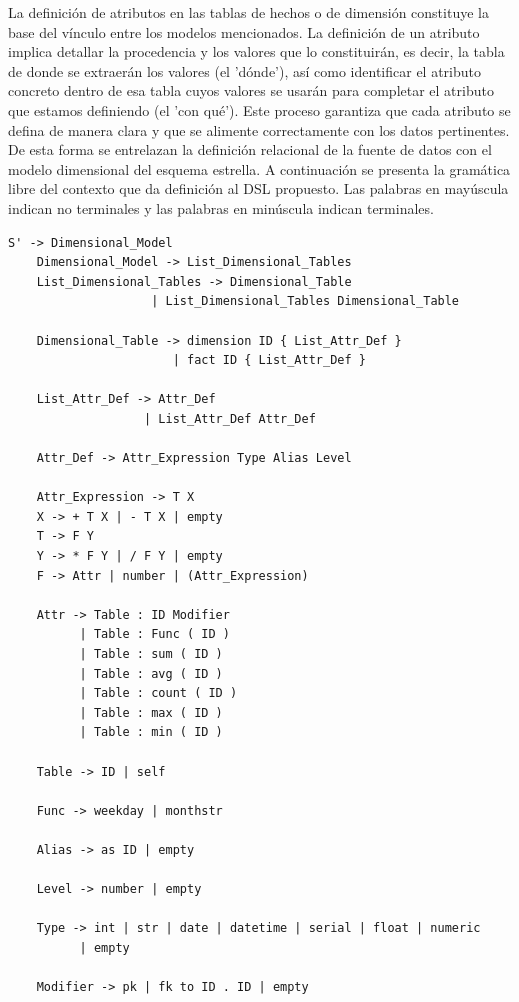 La definición de atributos en las tablas de hechos o de dimensión constituye la base del vínculo entre 
los modelos mencionados. La definición de un atributo 
implica detallar la procedencia y los valores que lo constituirán, es decir, la tabla de donde se extraerán los 
valores (el 'dónde'), 
así como identificar el atributo concreto dentro de esa tabla cuyos valores se usarán para completar el atributo 
que estamos definiendo (el 'con qué'). Este proceso garantiza que cada atributo se defina de manera clara y que 
se alimente correctamente con los datos pertinentes. De esta forma se entrelazan la definición relacional 
de la fuente de datos con el modelo dimensional del esquema estrella. A continuación se presenta la gramática 
libre del contexto que da definición al DSL propuesto. Las palabras en mayúscula indican no terminales y 
las palabras en minúscula indican terminales.

\begin{lstlisting}[caption={Gram\'atica libre del contexto del lenguaje de dominio espec\'ifico}]
    S' -> Dimensional_Model
    Dimensional_Model -> List_Dimensional_Tables
    List_Dimensional_Tables -> Dimensional_Table
                    | List_Dimensional_Tables Dimensional_Table

    Dimensional_Table -> dimension ID { List_Attr_Def }
                       | fact ID { List_Attr_Def }

    List_Attr_Def -> Attr_Def
                   | List_Attr_Def Attr_Def

    Attr_Def -> Attr_Expression Type Alias Level

    Attr_Expression -> T X
    X -> + T X | - T X | empty
    T -> F Y
    Y -> * F Y | / F Y | empty
    F -> Attr | number | (Attr_Expression)

    Attr -> Table : ID Modifier
          | Table : Func ( ID )
          | Table : sum ( ID )
          | Table : avg ( ID )
          | Table : count ( ID )
          | Table : max ( ID )
          | Table : min ( ID )

    Table -> ID | self

    Func -> weekday | monthstr

    Alias -> as ID | empty

    Level -> number | empty

    Type -> int | str | date | datetime | serial | float | numeric 
          | empty

    Modifier -> pk | fk to ID . ID | empty
\end{lstlisting}

